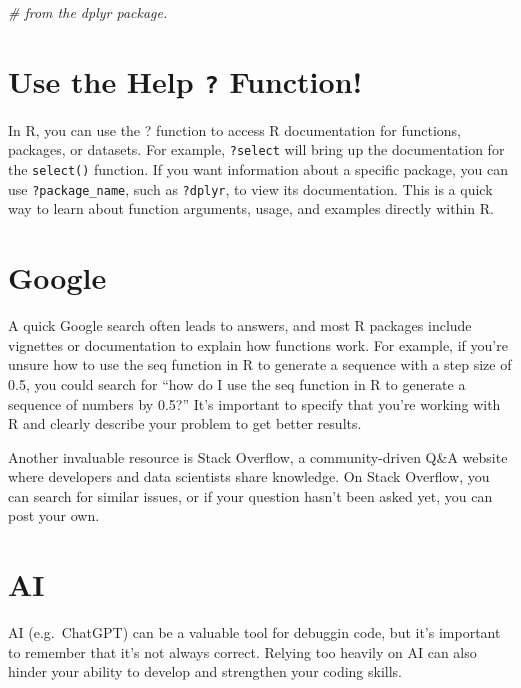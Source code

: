 \documentclass[
]{book}
\newenvironment{Shaded}{\begin{snugshade}}{\end{snugshade}}
\newcommand{\CommentTok}[1]{\textcolor[rgb]{0.56,0.35,0.01}{\textit{#1}}}
\begin{document}
\begin{Shaded}
\begin{Highlighting}[]
\CommentTok{\# from the dplyr package.}
\end{Highlighting}
\end{Shaded}

\section{\texorpdfstring{Use the Help \texttt{?} Function!}{Use the Help ? Function!}}\label{use-the-help-function}

In R, you can use the ? function to access R documentation for functions, packages, or datasets. For example, \texttt{?select} will bring up the documentation for the \texttt{select()} function. If you want information about a specific package, you can use \texttt{?package\_name}, such as \texttt{?dplyr}, to view its documentation. This is a quick way to learn about function arguments, usage, and examples directly within R.

\section{Google}\label{google}

A quick Google search often leads to answers, and most R packages include vignettes or documentation to explain how functions work. For example, if you're unsure how to use the seq function in R to generate a sequence with a step size of 0.5, you could search for ``how do I use the seq function in R to generate a sequence of numbers by 0.5?'' It's important to specify that you're working with R and clearly describe your problem to get better results.

Another invaluable resource is Stack Overflow, a community-driven Q\&A website where developers and data scientists share knowledge. On Stack Overflow, you can search for similar issues, or if your question hasn't been asked yet, you can post your own.

\section{AI}\label{ai}

AI (e.g.~ChatGPT) can be a valuable tool for debuggin code, but it's important to remember that it's not always correct. Relying too heavily on AI can also hinder your ability to develop and strengthen your coding skills.
\end{document}

